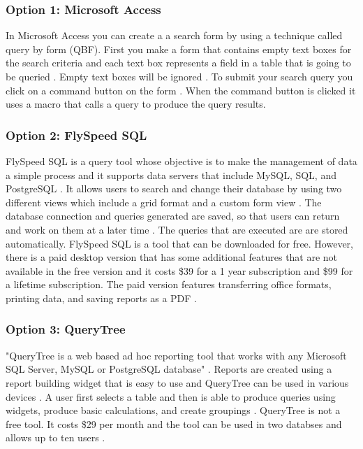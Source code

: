 \documentclass[letterpaper,10pt,serif, draftclsnofoot,onecolumn, compsoc, titlepage]{IEEEtran}
\begin{document}
\subsubsection{Option 1: Microsoft Access}
In Microsoft Access you can create a a search form by using a technique called query by form (QBF). First you make a form that contains empty text boxes for the search criteria and each text box represents a field in a table that is going to be queried \cite{Micro}. Empty text boxes will be ignored \cite{Micro}. To submit your search query you click on a command button on the form \cite{Micro}. When the command button is clicked it uses a macro that calls a query to produce the query results. 
 
\subsubsection{Option 2: FlySpeed SQL}
FlySpeed SQL is a query tool whose objective is to make the management of data a simple process and it supports data servers that include MySQL, SQL, and PostgreSQL \cite{Andrew}. It allows users to search and change their database by using two different views which include a grid format and a custom form view \cite{Andrew}.  The database connection and queries generated are saved, so that users can return and work on them at a later time \cite{Fly}. The queries that are executed are are stored automatically\cite{Fly}. FlySpeed SQL is a tool that can be downloaded for free. However, there is a paid desktop version that has some additional features that are not available in the free version and it costs \$39 for a 1 year subscription and \$99 for a lifetime subscription\cite{FlyCost}. The paid version features transferring office formats, printing data, and saving reports as a PDF \cite{Fly}. 

\subsubsection{Option 3: QueryTree}
"QueryTree is a web based ad hoc reporting tool that works with any Microsoft SQL Server, MySQL or PostgreSQL database" \cite{QueryTree}. Reports are created using a report building widget that is easy to use and QueryTree can be used in various devices \cite{QueryTree}. A user first selects a table and then is able to produce queries using widgets, produce basic calculations, and create groupings \cite{QueryTree}. QueryTree is not a free tool. It costs \$29 per month and the tool can be used in two databses and allows up to ten users \cite{QueryTree}. 
\end{document}
